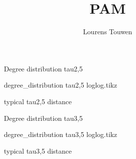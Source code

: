 \documentclass[fleqn]{article}
\title{PAM}
\author{Lourens Touwen}
\begin{document}
	
	\pagestyle{plain}
	
	\maketitle
	
	\newlength\fheight 
	\newlength\fwidth 
	\setlength{} 
	\setlength{}
	
	
	\begin{figure}[!htb]
		\centering
		
		\caption{Degree distribution tau2,5}
	\end{figure}
	
	\begin{figure}[!htb]
		\centering
		
		\caption{degree\_distribution tau2,5 loglog.tikz}
	\end{figure}

	\begin{figure}[!htb]
		\centering
		
		\caption{typical tau2,5 distance}
	\end{figure}

	\begin{figure}[!htb]
		\centering
		
		\caption{Degree distribution tau3,5}
	\end{figure}
	
	\begin{figure}[!htb]
		\centering
		
		\caption{degree\_distribution tau3,5 loglog.tikz}
	\end{figure}
	
	\begin{figure}[!htb]
		\centering
		
		\caption{typical tau3,5 distance}
	\end{figure}
\end{document}
